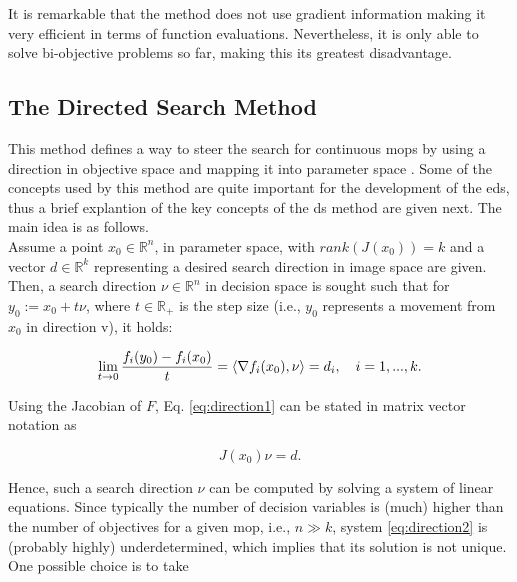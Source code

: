 \begin{comment}

\begin{figure}[H]
\centering \texttt{[image: img/dzz\_method.png]}
\caption{DZZ method example}
\label{Fig:dzz_example}
\end{figure}

\end{comment}

It is remarkable that the method does not use gradient information making it very efficient in terms of function evaluations. Nevertheless, it is only able to solve bi-objective problems so far, making this its greatest disadvantage.

\subsection{The Directed Search Method}
\label{sec:directed_search}

This method defines a way to steer the search for continuous \glspl{mop} by using a direction in objective space and mapping it into parameter space  \cite{directed_search}. Some of the concepts used by this method are quite important for the development of the \gls{eds}, thus a brief explantion of the key concepts of the \gls{ds} method are given next. The main idea is as follows.\\

Assume a point $x_0 \in \mathbb{R}^n$, in parameter space, with $rank(J(x_0)) = k$ and a vector $d \in \mathbb{R}^k$ representing a desired search direction in image space are given. Then, a search direction $\nu \in \mathbb{R}^n$ in decision space is sought such that for $y_0 := x_0 + t\nu$, where $t \in \mathbb{R}_+$ is the step size (i.e., $y_0$ represents a movement from $x_0$ in direction v), it holds:

\begin{equation}
	 \lim_{t \to 0} \frac{f_i(y_0) - f_i(x_0)}{t} = \langle \nabla f_i(x_0), \nu \rangle = d_i, \quad i = 1,...,k.\\
	 \label{eq:direction1}
\end{equation}

Using the Jacobian of $F$, Eq. \eqref{eq:direction1} can be stated in matrix vector notation as

\begin{equation}
	J(x_0)\nu = d.
	\label{eq:direction2}
\end{equation}

Hence, such a search direction $\nu$ can be computed by solving a system of linear equations. Since typically the number of decision variables is (much) higher than the number of objectives for a given \gls{mop}, i.e., $n \gg k$, system \eqref{eq:direction2} is (probably highly) underdetermined, which implies that its solution is not unique. One possible choice is to take

